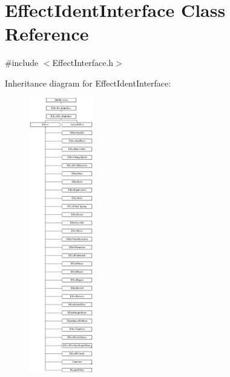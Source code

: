 \hypertarget{class_effect_ident_interface}{}\section{Effect\+Ident\+Interface Class Reference}
\label{class_effect_ident_interface}


{\ttfamily \#include $<$Effect\+Interface.\+h$>$}

Inheritance diagram for Effect\+Ident\+Interface\+:\begin{figure}[H]
\begin{center}
\leavevmode
\includegraphics[height=12.000000cm]{class_effect_ident_interface}
\end{center}
\end{figure}
